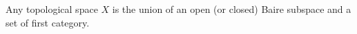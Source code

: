 Any topological space $X$ is the union of an open (or closed) Baire subspace and a set of first category.
